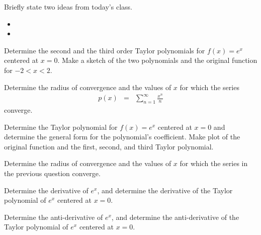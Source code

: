 \postClass

\begin{problem}
\item Briefly state two ideas from today's class.
  \begin{itemize}
  \item
  \item
  \end{itemize}
\item
  \begin{subproblem}
    \item
  \end{subproblem}
\end{problem}



\begin{problem}
\item Determine the second and the third order Taylor polynomials for
  $f(x)=e^x$ centered at $x=0$. Make a sketch of the two polynomials
  and the original function for $-2 < x < 2$.

  \vfill

  \clearpage

\item Determine the radius of convergence and the values of $x$ for
  which the series
  \begin{eqnarray*}
    p(x) & = & \sum^\infty_{n=1} \frac{x^n}{n}
  \end{eqnarray*}
  converge.

  \vfill

\end{problem}


\begin{problem}
\item Determine the Taylor polynomial for $f(x)=e^x$ centered at $x=0$
  and determine the general form for the polynomial's coefficient.
  Make plot of the original function and the first, second, and third Taylor polynomial.

  \vfill


  \clearpage

\item Determine the radius of convergence and the values of $x$ for
  which the series in the previous question converge.

  \vfill


  \clearpage

\item Determine the derivative of $e^x$, and determine the derivative of the Taylor
polynomial of $e^x$ centered at $x=0$.
  \vfill

  \clearpage

  \item Determine the anti-derivative of $e^x$, and determine the anti-derivative of the Taylor
  polynomial of $e^x$ centered at $x=0$.
    \vfill

\end{problem}


